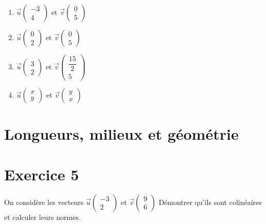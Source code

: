\documentclass[french]{article}
\begin{document}
\begin{enumerate}
\item  $\overrightarrow{u} \left( \begin{array}{c}
-3\\
4
\end{array} \right)$ et $\overrightarrow{v} \left( \begin{array}{c}
0\\
5
\end{array} \right)$

\item  $\overrightarrow{u} \left( \begin{array}{c}
0\\
2
\end{array} \right)$ et $\overrightarrow{v} \left( \begin{array}{c}
0\\
5
\end{array} \right)$



\item  $\overrightarrow{u} \left( \begin{array}{c}
3\\
2
\end{array} \right)$ et $\overrightarrow{v} \left( \begin{array}{c}
\dfrac{15}{2}\\
5
\end{array} \right)$

\item  $\overrightarrow{u} \left( \begin{array}{c}
x\\
y
\end{array} \right)$ et $\overrightarrow{v} \left( \begin{array}{c}
y\\
x
\end{array} \right)$

\end{enumerate}
\section{Longueurs, milieux et géométrie}
\section*{Exercice 5}
On considère les vecteurs  $\overrightarrow{u} \left( \begin{array}{c}
-3\\
2
\end{array} \right)$ et $\overrightarrow{v} \left( \begin{array}{c}
9\\
6
\end{array} \right)$
Démontrer qu'ils sont colinéaires et calculer leurs normes.
\end{document}
